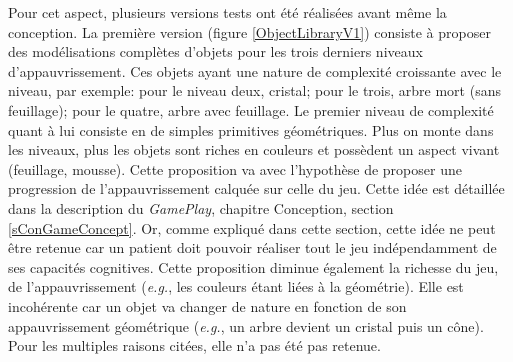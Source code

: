 		Pour cet aspect, plusieurs versions tests ont été réalisées avant même la conception. La première version (figure \ref{ObjectLibraryV1}) consiste à proposer des modélisations complètes d'objets pour les trois derniers niveaux d'appauvrissement. Ces objets ayant une nature de complexité croissante avec le niveau, par exemple: pour le niveau deux, cristal; pour le trois, arbre mort (sans feuillage); pour le quatre, arbre avec feuillage. Le premier niveau de complexité quant à lui consiste en de simples primitives géométriques. Plus on monte dans les niveaux, plus les objets sont riches en couleurs et possèdent un aspect vivant (feuillage, mousse). Cette proposition va avec l'hypothèse de proposer une progression de l'appauvrissement calquée sur celle du jeu. Cette idée est détaillée dans la description du \textit{GamePlay}, chapitre Conception, section \ref{sConGameConcept}. Or, comme expliqué dans cette section, cette idée ne peut être retenue car un patient doit pouvoir réaliser tout le jeu indépendamment de ses capacités cognitives. Cette proposition diminue également la richesse du jeu, de l'appauvrissement (\textit{e.g.}, les couleurs étant liées à la géométrie). Elle est incohérente car un objet va changer de nature en fonction de son appauvrissement géométrique (\textit{e.g.}, un arbre devient un cristal puis un cône). Pour les multiples raisons citées, elle n'a pas été pas retenue.\medskip	
	
		\begin{minipage}{\linewidth}
			\label{ObjectLibraryV1}%
		\end{minipage}\medskip
		\\	
		
